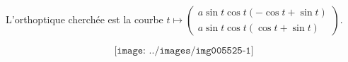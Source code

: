 {\begin{enumerate}
{L'orthoptique cherchée est la courbe $t\mapsto\left(
\begin{array}{c}
a\sin t\cos t(-\cos t+\sin t)\\
a\sin t\cos t(\cos t+\sin t)
\end{array}
\right)$.

$$\texttt{[image: ../images/img005525-1]}$$}
\end{enumerate}
}